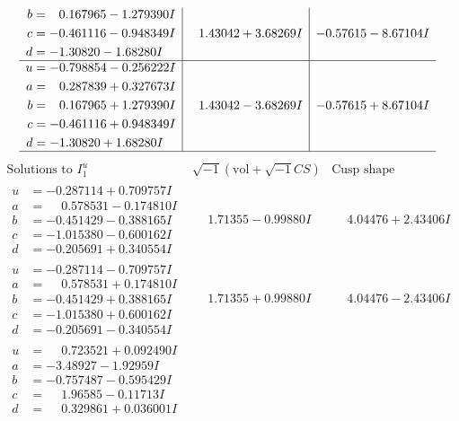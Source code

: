 \documentclass[1p]{elsarticle_modified}
\theoremstyle{definition}
\newcommand{\I}{\sqrt{-1}}
\begin{document}
$$\begin{array}{c|c|c}
\begin{aligned}
b &= \phantom{-}0.167965 - 1.279390 I \\
c &= -0.461116 - 0.948349 I \\
d &= -1.30820 - 1.68280 I\end{aligned}
 & \phantom{-}1.43042 + 3.68269 I & -0.57615 - 8.67104 I \\ \hline\begin{aligned}
u &= -0.798854 - 0.256222 I \\
a &= \phantom{-}0.287839 + 0.327673 I \\
b &= \phantom{-}0.167965 + 1.279390 I \\
c &= -0.461116 + 0.948349 I \\
d &= -1.30820 + 1.68280 I\end{aligned}
 & \phantom{-}1.43042 - 3.68269 I & -0.57615 + 8.67104 I\\
 \hline 
 \end{array}$$\newpage$$\begin{array}{c|c|c}  
\text{Solutions to }I^u_{1}& \I (\text{vol} + \sqrt{-1}CS) & \text{Cusp shape}\\
 \hline 
\begin{aligned}
u &= -0.287114 + 0.709757 I \\
a &= \phantom{-}0.578531 - 0.174810 I \\
b &= -0.451429 - 0.388165 I \\
c &= -1.015380 - 0.600162 I \\
d &= -0.205691 + 0.340554 I\end{aligned}
 & \phantom{-}1.71355 - 0.99880 I & \phantom{-}4.04476 + 2.43406 I \\ \hline\begin{aligned}
u &= -0.287114 - 0.709757 I \\
a &= \phantom{-}0.578531 + 0.174810 I \\
b &= -0.451429 + 0.388165 I \\
c &= -1.015380 + 0.600162 I \\
d &= -0.205691 - 0.340554 I\end{aligned}
 & \phantom{-}1.71355 + 0.99880 I & \phantom{-}4.04476 - 2.43406 I \\ \hline\begin{aligned}
u &= \phantom{-}0.723521 + 0.092490 I \\
a &= -3.48927 - 1.92959 I \\
b &= -0.757487 - 0.595429 I \\
c &= \phantom{-}1.96585 - 0.11713 I \\
d &= \phantom{-}0.329861 + 0.036001 I\end{aligned}

\end{array}$$
\end{document}
